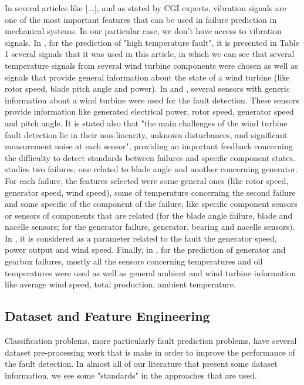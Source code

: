 In several articles like \cite{N_1_WIND} \cite{N_5_WIND} [...], and as stated by CGI experts, vibration signals are one of the most important features that can be used in failure prediction in mechanical systems. In our particular case, we don't have access to vibration signals.
In \cite{OLD_19_WIND}, for the prediction of "high temperature fault", it is presented in Table 1 several signals that it was used in this article, in which we can see that several temperature signals from several wind turbine components were chosen as well as signals that provide general information about the state of a wind turbine (like rotor speed, blade pitch angle and power).
In \cite{N_2_WIND} and \cite{39_WIND}, several sensors with generic information about a wind turbine were used for the fault detection. These sensors provide information like generated electrical power, rotor speed, generator speed and pitch angle. It is stated also that "the main challenges of the wind turbine fault detection lie in their non-linearity, unknown disturbances, and significant measurement noise at each sensor", providing an important feedback concerning the difficulty to detect standards between failures and specific component states.
\cite{N_3_WIND} studies two failures, one related to blade angle and another concerning generator. For each failure, the features selected were some general ones (like rotor speed, generator speed, wind speed), some of temperature concerning the second failure and some specific of the component of the failure, like specific component sensors or sensors of components that are related (for the blade angle failure, blade and nacelle sensors; for the generator failure, generator, bearing and nacelle sensors).
In \cite{OLD_41_WIND}, it is considered as a parameter related to the fault the generator speed, power output and wind speed.
Finally, in \cite{N_8_WIND}, for the prediction of generator and gearbox failures, mostly all the sensors concerning temperatures and oil temperatures were used as well as general ambient and wind turbine information like average wind speed, total production, ambient temperature.


\subsection{Dataset and Feature Engineering}

Classification problems, more particularly fault prediction problems, have several dataset pre-processing work that is make in order to improve the performance of the fault detection. In almost all of our literature that present some dataset information, we see some "standards" in the approaches that are used.

